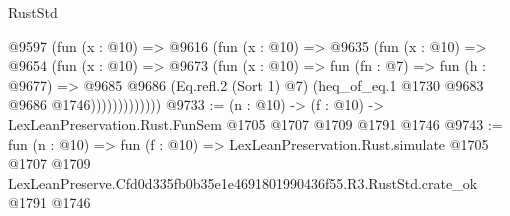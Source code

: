 \begin{lexlean}{RustStd}
\begin{coremodule}
                @9597
                  (fun (x : @10) =>
                  @9616
                    (fun (x : @10) =>
                    @9635
                      (fun (x : @10) =>
                      @9654
                        (fun (x : @10) =>
                        @9673
                          (fun (x : @10) =>
                          fun (fn : @7) =>
                          fun (h : @9677) =>
                          @9685
                            @9686
                            (Eq.refl.{2} (Sort 1) @7)
                            (heq_of_eq.{1} @1730 @9683 @9686 @1746)))))))))))))
@9733 := (n : @10) -> (f : @10) -> LexLeanPreservation.Rust.FunSem @1705 @1707 @1709 @1791 @1746
@9743 := fun (n : @10) =>
  fun (f : @10) =>
  LexLeanPreservation.Rust.simulate
    @1705
    @1707
    @1709
    LexLeanPreserve.Cfd0d335fb0b35e1e4691801990436f55.R3.RustStd.crate_ok
    @1791
    @1746
\end{coremodule}
\end{lexlean}
